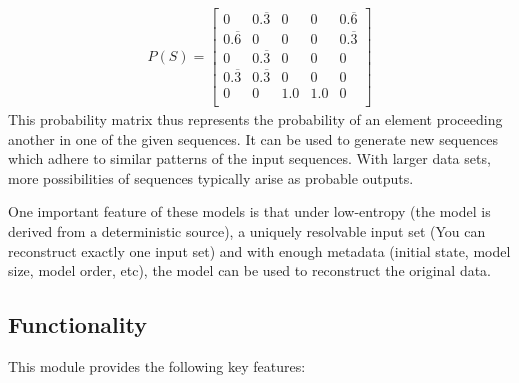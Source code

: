 \begin{align}
P(S) = \left[
\begin{matrix}
0 & 0.\overline{3} & 0 & 0 & 0.\overline{6} \\ 
0.\overline{6} & 0 & 0 & 0 & 0.\overline{3} \\ 
0 & 0.\overline{3} & 0 & 0 & 0 \\ 
0.\overline{3} & 0.\overline{3} & 0 & 0 & 0\\ 
0 & 0 & 1.0 & 1.0 & 0 \\ 
\end{matrix}\right]
\end{align}
This probability matrix thus represents the probability of an element proceeding another in one of the given sequences. It can be used to generate new sequences which adhere to similar patterns of the input sequences. With larger data sets, more possibilities of sequences typically arise as probable outputs. 

One important feature of these models is that under low-entropy (the model is derived from a deterministic source), a uniquely resolvable input set (You can reconstruct exactly one input set) and with enough metadata (initial state, model size, model order, etc), the model can be used to reconstruct the original data.


\subsection{Functionality}

This module provides the following key features:


